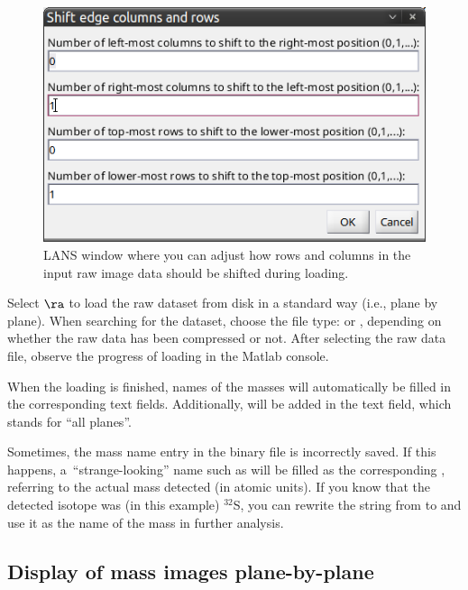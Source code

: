 \begin{figure}[!ht]
\centering
\includegraphics[scale=0.5]{figs1/LANS-shift-rows-columns}
\caption{\label{fig:shiftrowcolumn}%
LANS window where you can adjust how rows and columns in the input raw image data should be shifted during loading.}
\end{figure}

\s Select  $\ra$  to load the raw dataset from disk in a standard way (i.e., plane by plane). When searching for the dataset, choose the file type:  or , depending on whether the raw data has been compressed or not. After selecting the raw data file, observe the progress of loading in the Matlab console. 

\bul When the loading is finished, names of the masses will automatically be filled in the corresponding  text fields. Additionally, \ttt{[]} will be added in the  text field, which stands for ``all planes''.

\bul Sometimes, the mass name entry in the binary  file is incorrectly saved. If this happens, a~``strange-looking'' name such as  will be filled as the corresponding , referring to the actual mass detected (in atomic units). If you know that the detected isotope was (in this example) ${}^{32}$S, you can rewrite the string from  to  and use it as the name of the mass in further analysis.


\subsection{Display of mass images plane-by-plane}
\setcounter{step}{0}
\label{sec:display-masses-plane-by-plane}


